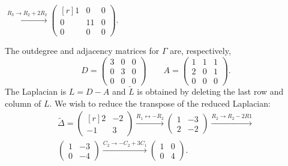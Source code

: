 \documentclass[../algebraNotesMSRI-UP2016.tex]{subfiles}
\begin{document}
\begin{frame}
\begin{itemize}
\begin{flushright}
$
\xrightarrow{R_3\to R_2+2R_2}
\boxed{\begin{pmatrix*}[r]
1 & 0 & 0 \\
0 & 11 & 0 \\
0 & 0 & 0 
\end{pmatrix*}}
$.		
\end{flushright}
\end{itemize}
\end{frame}

\begin{frame}
The outdegree and adjacency matrices for $\Gamma$ are, respectively,
\[
D=\begin{pmatrix}
	3 & 0 & 0 \\
	0 & 3 & 0 \\
	0 & 0 & 0 
	\end{pmatrix}
\qquad
A=\begin{pmatrix}
	1 & 1 & 1 \\
	2 & 0 & 1 \\
	0 & 0 & 0 
	\end{pmatrix}.	
\]
The Laplacian is $L=D-A$ and $\tilde{L}$ is obtained by deleting the last row and column of $L$.  We wish to reduce the transpose of the reduced Laplacian:
\begin{multline*}
\tilde{\Delta}= \begin{pmatrix*}[r]
	2 & -2 \\
	-1 & 3 
	\end{pmatrix*} \xrightarrow{R_1\leftrightarrow -R_2}
\begin{pmatrix}
1 & -3 \\
2 & -2
\end{pmatrix} \xrightarrow{R_2\to R_2-2R1} \\
\begin{pmatrix}
1 & -3 \\
0 & -4
\end{pmatrix} \xrightarrow{C_2\to -C_2+3C_1}
\begin{pmatrix}
1 & 0 \\
0 & 4
\end{pmatrix}.	
\end{multline*}
\end{frame}
\end{document}
